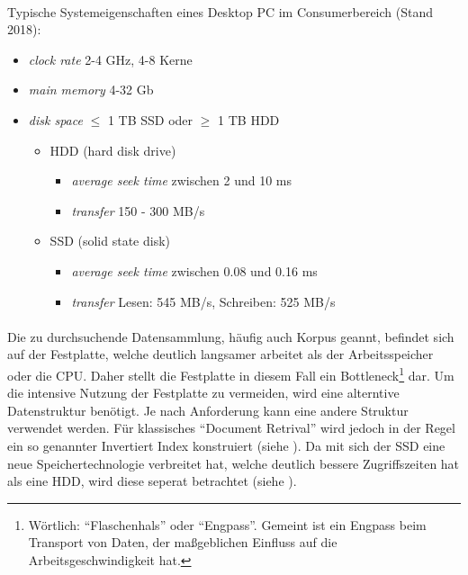 \paragraph{}
Typische Systemeigenschaften eines Desktop PC im Consumerbereich (Stand 2018):
\begin{itemize}
	\item \textit{clock rate} 2-4 GHz, 4-8 Kerne
	\item \textit{main memory} 4-32 Gb
	\item \textit{disk space} $\leq$ 1 TB SSD oder $\geq$ 1 TB HDD
	\begin{itemize}
	\item HDD (hard disk drive)
	\begin{itemize}
	\item \textit{average seek time} zwischen 2 und 10 ms
	\item \textit{transfer} 150 - 300 MB/s
	\end{itemize}
	\item SSD (solid state disk)
	\begin{itemize}
	\item \textit{average seek time} zwischen 0.08 und 0.16 ms
	\item \textit{transfer} Lesen: 545 MB/s, Schreiben: 525 MB/s
	\end{itemize}
	\end{itemize}
\end{itemize}	 
\par

\paragraph{}
Die zu durchsuchende Datensammlung, häufig auch Korpus geannt, befindet sich auf der Festplatte, welche deutlich langsamer arbeitet als der Arbeitsspeicher oder die CPU. Daher stellt die Festplatte in diesem Fall ein Bottleneck\footnote{Wörtlich: \enquote{Flaschenhals} oder \enquote{Engpass}. Gemeint ist ein Engpass beim Transport von Daten, der maßgeblichen Einfluss auf die Arbeitsgeschwindigkeit hat.} dar.
Um die intensive Nutzung der Festplatte zu vermeiden, wird eine alterntive Datenstruktur benötigt. Je nach Anforderung kann eine andere Struktur verwendet werden. Für klassisches \enquote{Document Retrival} wird jedoch in der Regel ein so genannter Invertiert Index konstruiert (siehe ).
Da mit sich der SSD eine neue Speichertechnologie verbreitet hat, welche deutlich bessere Zugriffszeiten hat als eine HDD, wird diese seperat betrachtet (siehe ).
\par

